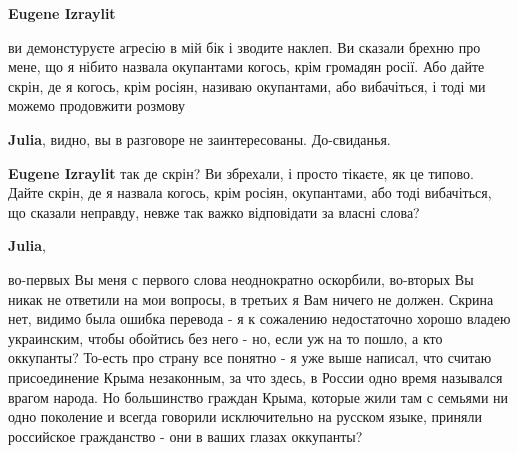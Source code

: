 \begin{itemize}
\begin{itemize}
 
\textbf{Eugene Izraylit} 

ви демонстуруєте агресію в мій бік і зводите наклеп. Ви сказали брехню про
мене, що я нібито назвала окупантами когось, крім громадян росії. Або дайте
скрін, де я когось, крім росіян, називаю окупантами, або вибачіться, і тоді ми
можемо продовжити розмову

 
\textbf{Julia}, видно, вы в разговоре не заинтересованы. До-свиданья.

 
\textbf{Eugene Izraylit} так де скрін? Ви збрехали, і просто тікаєте, як це
типово. Дайте скрін, де я назвала когось, крім росіян, окупантами, або тоді
вибачіться, що сказали неправду, невже так важко відповідати за власні слова?

 
\textbf{Julia}, 

во-первых Вы меня с первого слова неоднократно оскорбили, во-вторых Вы никак не
ответили на мои вопросы, в третьих я Вам ничего не должен. Скрина нет, видимо
была ошибка перевода - я к сожалению недостаточно хорошо владею украинским,
чтобы обойтись без него - но, если уж на то пошло, а кто оккупанты? То-есть про
страну все понятно - я уже выше написал, что считаю присоединение Крыма
незаконным, за что здесь, в России одно время назывался врагом народа. Но
большинство граждан Крыма, которые жили там с семьями ни одно поколение и
всегда говорили исключительно на русском языке, приняли российское гражданство
- они в ваших глазах оккупанты?



\end{itemize}
\end{itemize}
